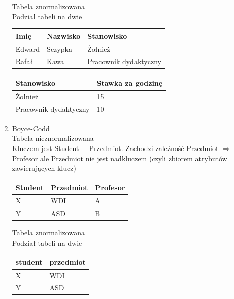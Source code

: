 \documentclass[12pt]{article}
\begin{document}
\begin{enumerate}
        Tabela znormalizowana\\
        Podział tabeli na dwie
        
        \begin{table}[H]
        \begin{tabular}{|l|l|l|}
        \hline
        Imię   & Nazwisko & Stanowisko            \\ \hline
        Edward & Sczypka  & Żołnież               \\ \hline
        Rafał  & Kawa     & Pracownik dydaktyczny \\ \hline
        \end{tabular}
        \end{table}
        
        \begin{table}[H]
        \begin{tabular}{|l|l|}
        \hline
        Stanowisko            & Stawka za godzinę \\ \hline
        Żołnież               & 15                \\ \hline
        Pracownik dydaktyczny & 10                \\ \hline
        \end{tabular}
        \end{table}
        
        \item{Boyce-Codd}\\
        Tabela nieznormalizowana\\
        Kluczem jest Student + Przedmiot. Zachodzi zależność Przedmiot $\Rightarrow$ Profesor ale Przedmiot nie jest nadkluczem (czyli zbiorem atrybutów zawierających klucz)
        
        \begin{table}[H]
        \begin{tabular}{|l|l|l|}
        \hline
        \textbf{Student} & \textbf{Przedmiot} & Profesor \\ \hline
        X       & WDI       & A        \\ \hline
        Y       & ASD       & B        \\ \hline
        \end{tabular}
        \end{table}
        
        Tabela znormalizowana\\
        Podział tabeli na dwie
        
        \begin{table}[H]
        \begin{tabular}{|l|l|}
        \hline
        student & przedmiot \\ \hline
        X       & WDI       \\ \hline
        Y       & ASD       \\ \hline
        \end{tabular}
        \end{table}
        

\end{enumerate}
\end{document}
